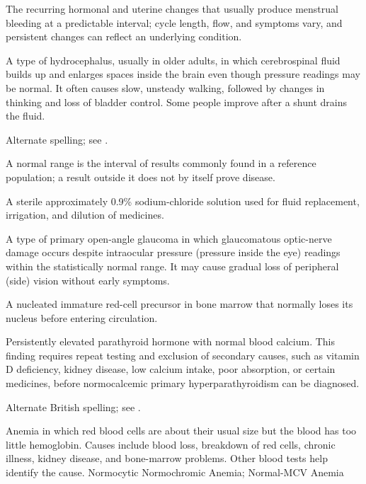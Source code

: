  The recurring hormonal and uterine changes that usually produce menstrual bleeding at a predictable interval; cycle length, flow, and symptoms vary, and persistent changes can reflect an underlying condition.

 A type of hydrocephalus, usually in older adults, in which cerebrospinal fluid builds up and enlarges spaces inside the brain even though pressure readings may be normal. It often causes slow, unsteady walking, followed by changes in thinking and loss of bladder control. Some people improve after a shunt drains the fluid.

 Alternate spelling; see .

 A normal range is the interval of results commonly found in a reference population; a result outside it does not by itself prove disease.

 A sterile approximately 0.9\% sodium-chloride solution used for fluid replacement, irrigation, and dilution of medicines.

 A type of primary open-angle glaucoma in which glaucomatous optic-nerve damage occurs despite intraocular pressure (pressure inside the eye) readings within the statistically normal range. It may cause gradual loss of peripheral (side) vision without early symptoms.

 A nucleated immature red-cell precursor in bone marrow that normally loses its nucleus before entering circulation.

 Persistently elevated parathyroid hormone with normal blood calcium. This finding requires repeat testing and exclusion of secondary causes, such as vitamin D deficiency, kidney disease, low calcium intake, poor absorption, or certain medicines, before normocalcemic primary hyperparathyroidism can be diagnosed.

 Alternate British spelling; see .

 Anemia in which red blood cells are about their usual size but the blood has too little hemoglobin. Causes include blood loss, breakdown of red cells, chronic illness, kidney disease, and bone-marrow problems. Other blood tests help identify the cause.
\synonyms
Normocytic Normochromic Anemia; Normal-MCV Anemia

